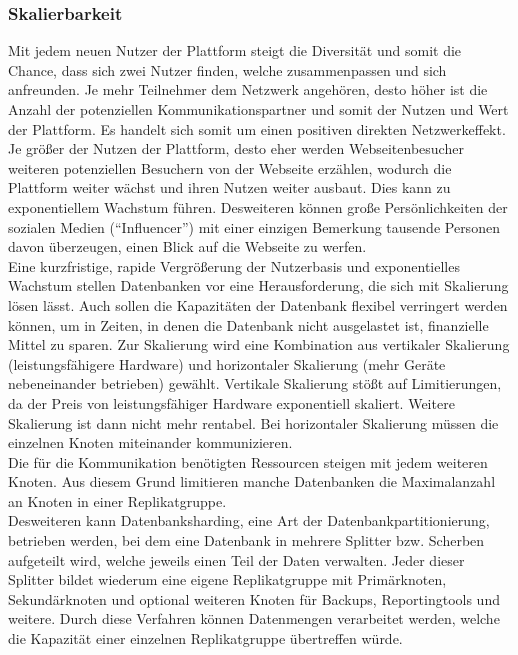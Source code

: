 \subsubsection{Skalierbarkeit}
Mit jedem neuen Nutzer der Plattform steigt die Diversität und somit die Chance, dass sich zwei Nutzer finden, welche zusammenpassen und sich anfreunden.
 Je mehr Teilnehmer dem Netzwerk angehören, desto höher ist die Anzahl der potenziellen Kommunikationspartner und somit der Nutzen und Wert der Plattform.
Es handelt sich somit um einen positiven direkten Netzwerkeffekt. %
Je größer der Nutzen der Plattform, desto eher werden Webseitenbesucher weiteren potenziellen Besuchern von der Webseite erzählen, wodurch die Plattform weiter wächst und ihren Nutzen weiter ausbaut.
Dies kann zu exponentiellem Wachstum führen. %
Desweiteren können große Persönlichkeiten der sozialen Medien (\enquote{Influencer}) mit einer einzigen Bemerkung tausende Personen davon überzeugen, einen Blick auf die Webseite zu werfen. \\
Eine kurzfristige, rapide Vergrößerung der Nutzerbasis und exponentielles Wachstum stellen Datenbanken vor eine Herausforderung, die sich mit Skalierung lösen lässt.
Auch sollen die Kapazitäten der Datenbank flexibel verringert werden können, um in Zeiten, in denen die Datenbank nicht ausgelastet ist, finanzielle Mittel zu sparen.
Zur Skalierung wird eine Kombination aus vertikaler Skalierung (leistungsfähigere Hardware) und horizontaler Skalierung (mehr Geräte nebeneinander betrieben) gewählt.
Vertikale Skalierung stößt auf Limitierungen, da der Preis von leistungsfähiger Hardware exponentiell skaliert. %
Weitere Skalierung ist dann nicht mehr rentabel.
Bei horizontaler Skalierung müssen die einzelnen Knoten miteinander kommunizieren. \\
Die für die Kommunikation benötigten Ressourcen steigen mit jedem weiteren Knoten.
Aus diesem Grund limitieren manche Datenbanken die Maximalanzahl an Knoten in einer Replikatgruppe. \cite{MG3}\\
Desweiteren kann Datenbanksharding, eine Art der Datenbankpartitionierung, betrieben werden, bei dem eine Datenbank in mehrere Splitter bzw. Scherben aufgeteilt wird, welche jeweils einen Teil der Daten verwalten.
Jeder dieser Splitter bildet wiederum eine eigene Replikatgruppe mit Primärknoten, Sekundärknoten und optional weiteren Knoten für Backups, Reportingtools und weitere. %
Durch diese Verfahren können Datenmengen verarbeitet werden, welche die Kapazität einer einzelnen Replikatgruppe übertreffen würde. \cite{MS1}

